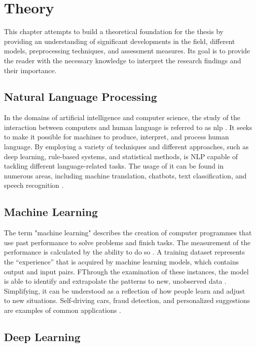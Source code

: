 \chapter{Theory}

This chapter attempts to build a theoretical foundation for the thesis by providing an understanding of significant developments in the field, different models, preprocessing techniques, and assessment measures. Its goal is to provide the reader with the necessary knowledge to interpret the research findings and their importance.

\section{Natural Language Processing}

In the domains of artificial intelligence and computer science, the study of the interaction between computers and human language is referred to as \acf{nlp} \citep{helland_tackling_2023}. It seeks to make it possible for machines to produce, interpret, and process human language. By employing a variety of techniques and different approaches, such as deep learning, rule-based systems, and statistical methods, is NLP capable of tackling different language-related tasks. The usage of it can be found in numerous areas, including machine translation, chatbots, text classification, and speech recognition \citep{helland_tackling_2023}.

\section{Machine Learning}

The term "machine learning" describes the creation of computer programmes that use past performance to solve problems and finish tasks. The measurement of the performance is calculated by the ability to do so \citep{helland_tackling_2023}. A training dataset represents the “experience” that is acquired by machine learning models, which contains output and input pairs. FThrough the examination of these instances, the model is able to identify and extrapolate the patterns to new, unobserved data \citep{helland_tackling_2023}. Simplifying, it can be understood as a reflection of how people learn and adjust to new situations. Self-driving cars, fraud detection, and personalized suggestions are examples of common applications \citep{helland_tackling_2023}.

\section{Deep Learning}


